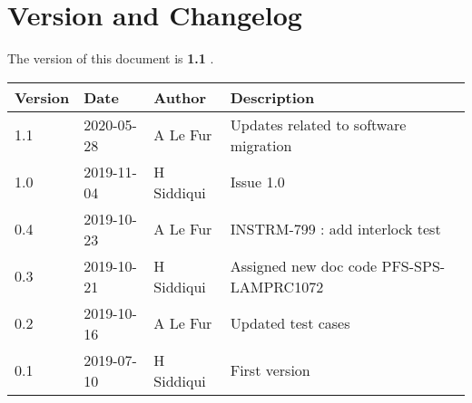 \section{Version and Changelog}

The version of this document is {\bf 1.1} .

\begin{table}[H]
    \begin{tabular}{|l|l|l|p{10cm}| }
    \hline
    {\bf Version} & {\bf Date} & {\bf Author} & {\bf Description} \\ \hline
    1.1 & 2020-05-28 & A Le Fur   & Updates related to software migration\\ \hline
    1.0 & 2019-11-04 & H Siddiqui & Issue 1.0\\ \hline
    0.4 & 2019-10-23 & A Le Fur & INSTRM-799 : add interlock test\\ \hline
    0.3 & 2019-10-21 & H Siddiqui & Assigned new doc code PFS-SPS-LAMPRC1072 \\ \hline
    0.2 & 2019-10-16 & A Le Fur & Updated test cases \\ \hline
    0.1 & 2019-07-10 & H Siddiqui & First version \\ \hline
    \end{tabular}
\end{table}

